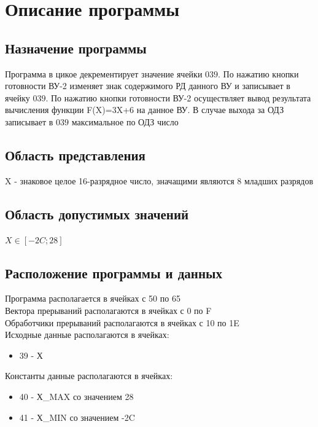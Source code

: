 \documentclass[12pt]{article}
\begin{document}
	\section{Описание программы}
	\subsection{Назначение программы}
	Программа в цикое декрементирует значение ячейки $ 039 $. По нажатию кнопки готовности ВУ-2 изменяет знак содержимого РД данного ВУ и записывает в ячейку $ 039 $. По нажатию кнопки готовности ВУ-2 осуществляет вывод результата вычисления функции F(X)=3X+6 на данное ВУ. В случае выхода за ОДЗ записывает в $ 039 $ максимальное по ОДЗ число
	
	\subsection{Область представления}
	X - знаковое целое 16-разрядное число, значащими являются 8 младших разрядов
	
	\subsection{Область допустимых значений}
	
	$ X \in \left[-2C;28\right] $
	
	\subsection{Расположение программы и данных}
	Программа располагается в ячейках с 50 по 65\\
	Вектора прерываний располагаются в ячейках с 0 по F\\
	Обработчики прерываний располагаются в ячейках с 10 по 1E\\
	Исходные данные располагаются в ячейках:
	\begin{itemize}
		\item 39 - Х
	\end{itemize}
	Константы данные располагаются в ячейках:
	\begin{itemize}
		\item 40 - Х\_MAX со значением 28
		\item 41 - Х\_MIN со значением -2C
	\end{itemize}
	
\end{document}
